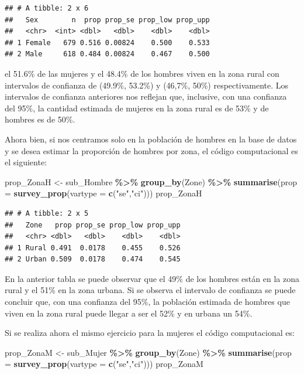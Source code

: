 \documentclass[
  spanish,
  12pt,
]{book}
\newenvironment{Shaded}{\begin{snugshade}}{\end{snugshade}}
\newcommand{\AttributeTok}[1]{\textcolor[rgb]{0.13,0.29,0.53}{#1}}
\newcommand{\FunctionTok}[1]{\textcolor[rgb]{0.13,0.29,0.53}{\textbf{#1}}}
\newcommand{\NormalTok}[1]{#1}
\newcommand{\OtherTok}[1]{\textcolor[rgb]{0.56,0.35,0.01}{#1}}
\newcommand{\SpecialCharTok}[1]{\textcolor[rgb]{0.81,0.36,0.00}{\textbf{#1}}}
\newcommand{\StringTok}[1]{\textcolor[rgb]{0.31,0.60,0.02}{#1}}
\begin{document}
\begin{verbatim}
## # A tibble: 2 x 6
##   Sex        n  prop prop_se prop_low prop_upp
##   <chr>  <int> <dbl>   <dbl>    <dbl>    <dbl>
## 1 Female   679 0.516 0.00824    0.500    0.533
## 2 Male     618 0.484 0.00824    0.467    0.500
\end{verbatim}

el 51.6\% de las mujeres y el 48.4\% de los hombres viven en la zona rural con intervalos de confianza de (49.9\%, 53.2\%) y (46,7\%, 50\%) respectivamente. Los intervalos de confianza anteriores nos reflejan que, inclusive, con una confianza del 95\%, la cantidad estimada de mujeres en la zona rural es de 53\% y de hombres es de 50\%.

Ahora bien, si nos centramos solo en la población de hombres en la base de datos y se desea estimar la proporción de hombres por zona, el código computacional es el siguiente:

\begin{Shaded}
\begin{Highlighting}[]
\NormalTok{prop\_ZonaH }\OtherTok{\textless{}{-}}\NormalTok{ sub\_Hombre }\SpecialCharTok{\%\textgreater{}\%} \FunctionTok{group\_by}\NormalTok{(Zone) }\SpecialCharTok{\%\textgreater{}\%} 
              \FunctionTok{summarise}\NormalTok{(}\AttributeTok{prop =} \FunctionTok{survey\_prop}\NormalTok{(}\AttributeTok{vartype =} \FunctionTok{c}\NormalTok{(}\StringTok{"se"}\NormalTok{,}\StringTok{"ci"}\NormalTok{)))}
\NormalTok{prop\_ZonaH}
\end{Highlighting}
\end{Shaded}

\begin{verbatim}
## # A tibble: 2 x 5
##   Zone   prop prop_se prop_low prop_upp
##   <chr> <dbl>   <dbl>    <dbl>    <dbl>
## 1 Rural 0.491  0.0178    0.455    0.526
## 2 Urban 0.509  0.0178    0.474    0.545
\end{verbatim}

En la anterior tabla se puede observar que el 49\% de los hombres están en la zona rural y el 51\% en la zona urbana. Si se observa el intervalo de confianza se puede concluir que, con una confianza del 95\%, la población estimada de hombres que viven en la zona rural puede llegar a ser el 52\% y en urbana un 54\%.

Si se realiza ahora el mismo ejercicio para la mujeres el código computacional es:

\begin{Shaded}
\begin{Highlighting}[]
\NormalTok{prop\_ZonaM }\OtherTok{\textless{}{-}}\NormalTok{ sub\_Mujer }\SpecialCharTok{\%\textgreater{}\%} \FunctionTok{group\_by}\NormalTok{(Zone) }\SpecialCharTok{\%\textgreater{}\%} 
              \FunctionTok{summarise}\NormalTok{(}\AttributeTok{prop =} \FunctionTok{survey\_prop}\NormalTok{(}\AttributeTok{vartype =} \FunctionTok{c}\NormalTok{(}\StringTok{"se"}\NormalTok{,}\StringTok{"ci"}\NormalTok{)))}
\NormalTok{prop\_ZonaM}
\end{Highlighting}
\end{Shaded}
\end{document}
